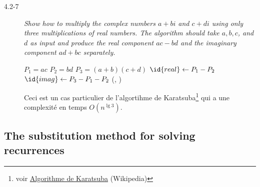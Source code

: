 \begin{description}
  \item[4.2-7] {\itshape Show how to multiply the complex numbers $a + bi$ and $c + di$ using only three multiplications of real numbers. The algorithm should take $a, b, c$, and $d$ as input and produce the real component $ac-bd$ and the imaginary component $ad + bc$ separately.}
    \begin{ex}
      \begin{codebox}%
        \li $P_1 = ac$
        \li $P_2 = bd$
        \li $P_3 = (a+b)(c+d)$
        \li $\id{real} \gets P_1 - P_2$
        \li $\id{imag} \gets P_3-P_1-P_2$
        \li \Return (, )
      \end{codebox}

      Ceci est un cas particulier de l'algortihme de Karatsuba\footnote{voir \href{https://en.wikipedia.org/wiki/Karatsuba_algorithm}{Algorithme de Karatsuba} (Wikipedia)} qui a une complexit\'e en temps $O(n^{\lg 3})$.

    \end{ex}

\end{description}

\subsection{The substitution method for solving recurrences}

